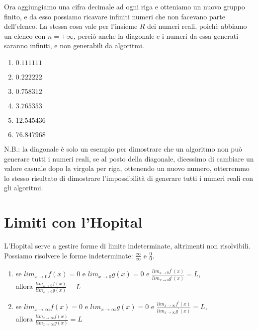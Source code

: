 \documentclass[11pt]{article}
\begin{document}
Ora aggiungiamo una cifra decimale ad ogni riga e otteniamo un nuovo gruppo finito, e da esso 
possiamo ricavare infiniti numeri che non facevano parte dell'elenco. La stessa cosa vale per l'insieme $R$ dei 
numeri reali, poichè abbiamo un elenco con $n = +\infty$, perciò anche la diagonale e i numeri 
da essa generati saranno infiniti, e non generabili da algoritmi.\\
\begin{enumerate}
    \item $0.111111$
    \item $0.222222$
    \item $0.758312$
    \item $3.765353$
    \item $12.545436$
    \item $76.847968$
\end{enumerate}
N.B.: la diagonale è solo un esempio per dimostrare che un algoritmo non può generare tutti i numeri reali, 
se al posto della diagonale, dicessimo di cambiare un valore casuale dopo la virgola per riga, ottenendo un nuovo numero, 
otterremmo lo stesso risultato di dimostrare l'impossibilità di generare tutti i numeri reali con gli algoritmi.
\section{Limiti con l'Hopital}
L'Hopital serve a gestire forme di limite indeterminate, altrimenti non risolvibili.\\
Possiamo risolvere le forme indeterminate: $\frac{\infty}{\infty}$ e $\frac{0}{0}$.\\
\begin{enumerate}
    \item se $lim_{x \rightarrow 0}f(x) = 0$ e $lim_{x \rightarrow 0}g(x) = 0$ e 
    $\frac{lim_{x \rightarrow 0}f^{'}(x)}{lim_{x \rightarrow 0}g^{'}(x)} = L$,\\ allora 
    $\frac{lim_{x \rightarrow 0}f(x)}{lim_{x \rightarrow 0}g(x)} = L$
    \item se $lim_{x \rightarrow \infty}f(x) = 0$ e $lim_{x \rightarrow \infty}g(x) = 0$ e 
    $\frac{lim_{x \rightarrow \infty}f^{'}(x)}{lim_{x \rightarrow \infty}g^{'}(x)} = L$,\\ allora 
    $\frac{lim_{x \rightarrow \infty}f(x)}{lim_{x \rightarrow \infty}g(x)} = L$
\end{enumerate}
\end{document}
